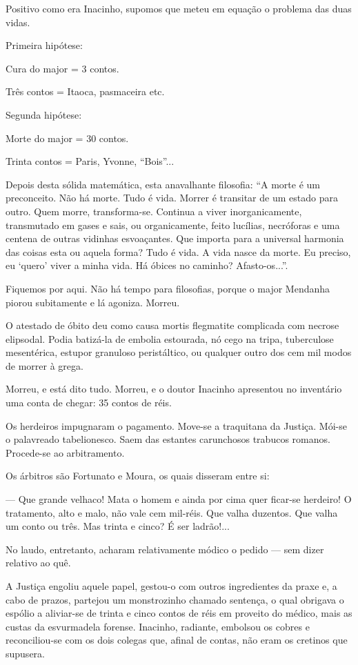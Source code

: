 Positivo como era Inacinho, supomos que meteu em equação o problema das
duas vidas.

Primeira hipótese:

Cura do major = 3 contos.

Três contos = Itaoca, pasmaceira etc.

Segunda hipótese:

Morte do major = 30 contos.

Trinta contos = Paris, Yvonne, ``Bois''...

Depois desta sólida matemática, esta anavalhante filosofia: ``A morte é
um preconceito. Não há morte. Tudo é vida. Morrer é transitar de um
estado para outro. Quem morre, transforma-se. Continua a viver
inorganicamente, transmutado em gases e sais, ou organicamente, feito
lucílias, necróforas e uma centena de outras vidinhas esvoaçantes. Que
importa para a universal harmonia das coisas esta ou aquela forma? Tudo
é vida. A vida nasce da morte. Eu preciso, eu `quero' viver a minha
vida. Há óbices no caminho? Afasto-os...''.

Fiquemos por aqui. Não há tempo para filosofias, porque o major Mendanha
piorou subitamente e lá agoniza. Morreu.

O atestado de óbito deu como causa mortis flegmatite complicada com
necrose elipsodal. Podia batizá-la de embolia estourada, nó cego na
tripa, tuberculose mesentérica, estupor granuloso peristáltico, ou
qualquer outro dos cem mil modos de morrer à grega.

Morreu, e está dito tudo. Morreu, e o doutor Inacinho apresentou no
inventário uma conta de chegar: 35 contos de réis.

Os herdeiros impugnaram o pagamento. Move-se a traquitana da Justiça.
Mói-se o palavreado tabelionesco. Saem das estantes carunchosos trabucos
romanos. Procede-se ao arbitramento.

Os árbitros são Fortunato e Moura, os quais disseram entre si:

--- Que grande velhaco! Mata o homem e ainda por cima quer ficar-se
herdeiro! O tratamento, alto e malo, não vale cem mil-réis. Que valha
duzentos. Que valha um conto ou três. Mas trinta e cinco? É ser
ladrão!...

No laudo, entretanto, acharam relativamente módico o pedido --- sem
dizer relativo ao quê.

A Justiça engoliu aquele papel, gestou-o com outros ingredientes da
praxe e, a cabo de prazos, partejou um monstrozinho chamado sentença, o
qual obrigava o espólio a aliviar-se de trinta e cinco contos de réis em
proveito do médico, mais as custas da esvurmadela forense. Inacinho,
radiante, embolsou os cobres e reconciliou-se com os dois colegas que,
afinal de contas, não eram os cretinos que supusera.

